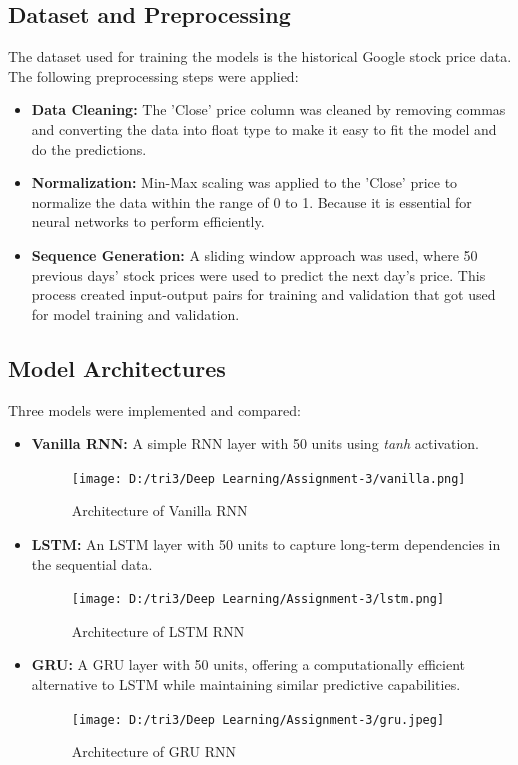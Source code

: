 \documentclass[10pt,twocolumn,a4paper]{article}
\begin{document}
\subsection{Dataset and Preprocessing}
The dataset used for training the models is the historical Google stock price data. The following preprocessing steps were applied:
\begin{itemize}
    \item \textbf{Data Cleaning:} The 'Close' price column was cleaned by removing commas and converting the data into float type to make it easy to fit the model and do the predictions.
    \item \textbf{Normalization:} Min-Max scaling was applied to the 'Close' price to normalize the data within the range of 0 to 1. Because it is essential for neural networks to perform efficiently. 
    \item \textbf{Sequence Generation:} A sliding window approach was used, where 50 previous days’ stock prices were used to predict the next day's price. This process created input-output pairs for training and validation that got used for model training and validation.
\end{itemize}

\subsection{Model Architectures}
Three models were implemented and compared:
\begin{itemize}
    \item \textbf{Vanilla RNN:} A simple RNN layer with 50 units using \textit{tanh} activation.
    \begin{figure}[htbp]
    \centering
    \texttt{[image: D:/tri3/Deep Learning/Assignment-3/vanilla.png]}
    \caption{Architecture of Vanilla RNN }
    \label{fig1: Implementation of AlexNet}
\end{figure}
    \item \textbf{LSTM:} An LSTM layer with 50 units to capture long-term dependencies in the sequential data.
    \begin{figure}[htbp]
    \centering
    \texttt{[image: D:/tri3/Deep Learning/Assignment-3/lstm.png]}
    \caption{Architecture of LSTM RNN }
    \label{fig1: Implementation of AlexNet}
\end{figure}
    \item \textbf{GRU:} A GRU layer with 50 units, offering a computationally efficient alternative to LSTM while maintaining similar predictive capabilities.
    \begin{figure}[htbp]
    \centering
    \texttt{[image: D:/tri3/Deep Learning/Assignment-3/gru.jpeg]}
    \caption{Architecture of GRU RNN }
    \label{fig1: Implementation of AlexNet}
\end{figure}
\end{itemize}
\end{document}
